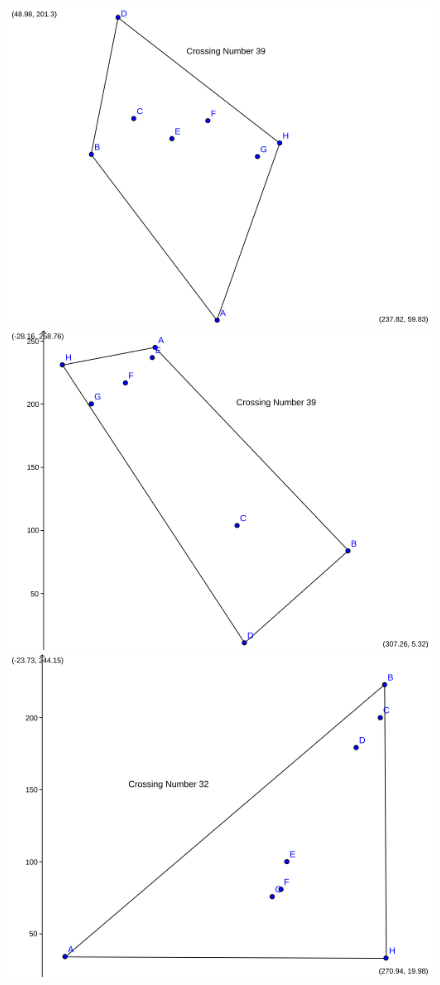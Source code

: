 \documentclass[11pt,epsf,times,letterpaper]{article}
\begin{document}
	
	
	\begin{figure}
		\includegraphics[scale=.33]{png/o1952.png}
		\includegraphics[scale=.15]{png/o2043.png}
		\includegraphics[scale=.15]{png/o2255.png}

\end{figure}
\end{document}
